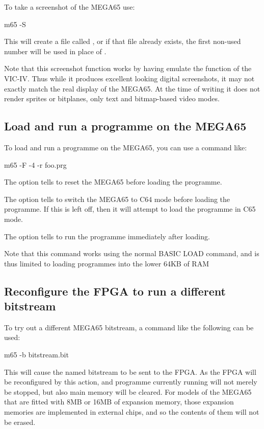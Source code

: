 To take a screenshot of the MEGA65 use:

\begin{screenoutput}
m65 -S
\end{screenoutput}

This will create a file called ,
or if that file already exists, the first non-used number will be used
in place of .

Note that this screenshot function works by having  emulate the
function of the VIC-IV. Thus while it produces excellent looking
digital screenshots, it may not exactly match the real display of the
MEGA65.  At the time of writing it does not render sprites or
bitplanes, only text and bitmap-based video modes.

\subsection{Load and run a programme on the MEGA65}

To load and run a programme on the MEGA65, you can use a command like:

\begin{screenoutput}
m65 -F -4 -r foo.prg
\end{screenoutput}

The  option tells  to reset the MEGA65
before loading the programme.

The  option tells  to switch the MEGA65
to C64 mode before loading the programme. If this is left off, then it
will attempt to load the programme in C65 mode.

The  option tells  to run the programme
immediately after loading.

Note that this command works using the normal BASIC LOAD command, and
is thus limited to loading programmes into the lower 64KB of RAM

\subsection{Reconfigure the FPGA to run a different bitstream}

To try out a different MEGA65 bitstream, a command like the following can be
used:

\begin{screenoutput}
m65 -b bitstream.bit
\end{screenoutput}

This will cause the named bitstream to be sent to the FPGA.  As the
FPGA will be reconfigured by this action, and programme currently
running will not merely be stopped, but also main memory will be
cleared. For models of the MEGA65 that are fitted with 8MB or 16MB of
expansion memory, those expansion memories are implemented in external
chips, and so the contents of them will not be erased.

